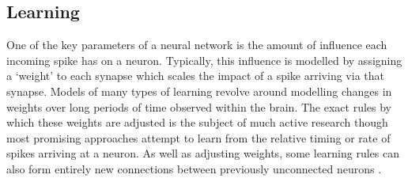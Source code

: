 %
%

\subsection{Learning}
One of the key parameters of a neural network is the amount of influence
each incoming spike has on a neuron. Typically, this influence is modelled
by assigning a `weight' to each synapse which scales the impact of a spike
arriving via that synapse.
Models of many types of learning revolve around modelling changes in
weights over long periods of time observed within the brain. The exact
rules by which these weights are adjusted is the subject of much active
research though most promising approaches attempt to learn from the
relative timing \cite{pfister2006triplets} or rate \cite{bienenstock1982theory} of spikes
arriving at a neuron. As well as adjusting weights, some learning rules
can also form entirely new connections between previously unconnected
neurons \cite{bamford2010synaptic}.
%
%

